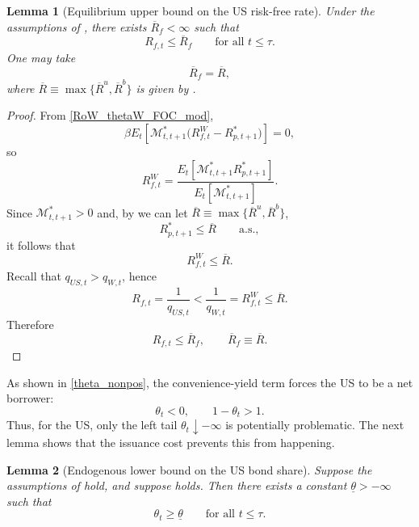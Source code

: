 \documentclass[12pt]{article}
\theoremstyle{plain}
\newtheorem{lem}{Lemma}
\begin{document}
\begin{lem}[Equilibrium upper bound on the US risk-free rate]\label{lem_rf_upper_bound}
Under the assumptions of , there exists
$\overline R_f<\infty$ such that
\[
R_{f,t}\le \overline R_f
\qquad\text{for all }t\le\tau.
\]
One may take
\[
\overline R_f=\overline R,
\]
where $\overline R\equiv \max \{\overline R^u, \overline R^b\}$ is given by .
\end{lem}

\begin{proof}
From \eqref{RoW_thetaW_FOC_mod},
\[
\beta E_t\!\left[\mathcal M_{t,t+1}^*\bigl(R_{f,t}^W-R_{p,t+1}^*\bigr)\right]=0,
\]
so
\[
R_{f,t}^W
=
\frac{E_t\!\left[\mathcal M_{t,t+1}^*R_{p,t+1}^*\right]}
{E_t\!\left[\mathcal M_{t,t+1}^*\right]}.
\]
Since $\mathcal M_{t,t+1}^*>0$ and, by  we can let $\overline R\equiv \max \{\overline R^u, \overline R^b\}$,
\[
R_{p,t+1}^*\le \overline R
\qquad\text{a.s.},
\]
it follows that
\[
R_{f,t}^W\le \overline R.
\]
Recall that $q_{US,t}>q_{W,t}$, hence
\[
R_{f,t}=\frac{1}{q_{US,t}}<\frac{1}{q_{W,t}}=R_{f,t}^W\le \overline R.
\]
Therefore
\[
R_{f,t}\le \overline R_f,
\qquad
\overline R_f\equiv \overline R.
\]
\end{proof}


As shown in \eqref{theta_nonpos}, the convenience-yield term forces the US to be a net borrower:
\[
\theta_t<0,
\qquad
1-\theta_t>1.
\]
Thus, for the US, only the left tail $\theta_t\downarrow-\infty$ is potentially problematic. The next lemma
shows that the issuance cost prevents this from happening.

\begin{lem}[Endogenous lower bound on the US bond share]\label{lem2}
Suppose the assumptions of  hold, and suppose
 holds. Then there exists a constant $\underline\theta>-\infty$ such that
\[
\theta_t\ge \underline\theta
\qquad\text{for all }t\le\tau.
\]
\end{lem}
\end{document}
